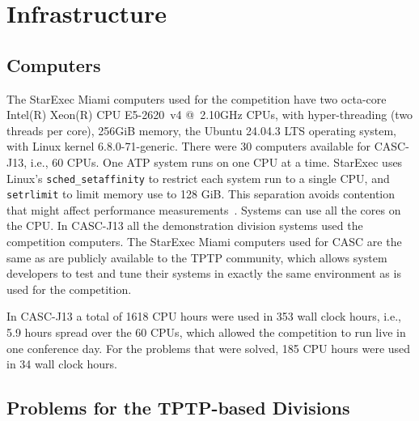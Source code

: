 \documentclass[aic]{iosart2x}
\newcommand{\THIS}{\mbox{CASC-J13}}
\begin{document}
\section{Infrastructure}
\label{Infrastructure}

\subsection{Computers}
\label{Computers}

The StarExec Miami computers used for the competition have
two octa-core Intel(R) Xeon(R) CPU E5-2620~v4 @~2.10GHz CPUs, with hyper-threading (two threads 
per core),
256GiB memory,
the Ubuntu 24.04.3 LTS operating system, with Linux kernel 6.8.0-71-generic.
There were 30 computers available for \THIS{}, i.e., 60 CPUs.
One ATP system runs on one CPU at a time.
StarExec uses Linux's \texttt{sched\_setaffinity} to restrict each system run to a single CPU,
and \texttt{setrlimit} to limit memory use to 128 GiB.
This separation avoids contention that might affect performance measurements~\cite{BLW19,FG+24}.
Systems can use all the cores on the CPU.
In \THIS{} all the demonstration division systems used the competition computers.
The StarExec Miami computers used for CASC are the same as are publicly available to the TPTP 
community, which allows system developers to test and tune their systems in exactly the same 
environment as is used for the competition.

In \THIS{} a total of 1618 CPU hours were used in 353 wall clock hours, i.e., 5.9 hours spread
over the 60 CPUs, which allowed the competition to run live in one conference day.
For the problems that were solved, 185 CPU hours were used in 34 wall clock hours.

\subsection{Problems for the TPTP-based Divisions}
\label{TPTPProblems}
\end{document}

